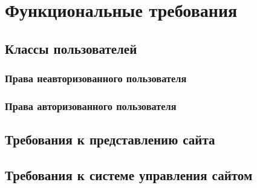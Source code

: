 \section{Функциональные требования}
\subsection{Классы пользователей}

\subsubsection{Права неавторизованного пользователя}

\subsubsection{Права авторизованного пользователя}

\subsection{Требования к представлению сайта}

\subsection{Требования к системе управления сайтом}

